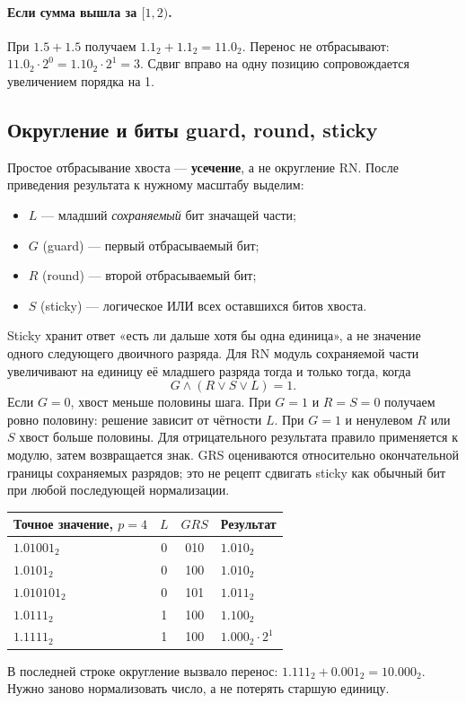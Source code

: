 \paragraph{Если сумма вышла за $[1,2)$.}
При $1.5+1.5$ получаем $1.1_2+1.1_2=11.0_2$.
Перенос не отбрасывают: $11.0_2\cdot2^0=1.10_2\cdot2^1=3$.
Сдвиг вправо на одну позицию сопровождается увеличением порядка на 1.

\subsection{Округление и биты guard, round, sticky}
Простое отбрасывание хвоста --- \textbf{усечение}, а не округление RN.
После приведения результата к нужному масштабу выделим:
\begin{itemize}
    \item $L$ --- младший \emph{сохраняемый} бит значащей части;
    \item $G$ (guard) --- первый отбрасываемый бит;
    \item $R$ (round) --- второй отбрасываемый бит;
    \item $S$ (sticky) --- логическое ИЛИ всех оставшихся битов хвоста.
\end{itemize}
Sticky хранит ответ «есть ли дальше хотя бы одна единица», а не значение
одного следующего двоичного разряда. Для RN модуль сохраняемой части
увеличивают на единицу её младшего разряда тогда и только тогда, когда
\[
G\mathbin{\land}(R\mathbin{\lor}S\mathbin{\lor}L)=1.
\]
Если $G=0$, хвост меньше половины шага. При $G=1$ и $R=S=0$
получаем ровно половину: решение зависит от чётности $L$.
При $G=1$ и ненулевом $R$ или $S$ хвост больше половины.
Для отрицательного результата правило применяется к модулю, затем
возвращается знак. GRS оцениваются относительно окончательной границы
сохраняемых разрядов; это не рецепт сдвигать sticky как обычный бит
при любой последующей нормализации.

\begin{center}
\begin{tabular}{|l|c|c|l|}
\hline
Точное значение, $p=4$ & $L$ & $GRS$ & Результат \\
\hline
$1.01001_2$ & 0 & 010 & $1.010_2$ \\
$1.0101_2$ & 0 & 100 & $1.010_2$ \\
$1.010101_2$ & 0 & 101 & $1.011_2$ \\
$1.0111_2$ & 1 & 100 & $1.100_2$ \\
$1.1111_2$ & 1 & 100 & $1.000_2\cdot2^1$ \\
\hline
\end{tabular}
\end{center}
В последней строке округление вызвало перенос: $1.111_2+0.001_2=10.000_2$.
Нужно заново нормализовать число, а не потерять старшую единицу.

